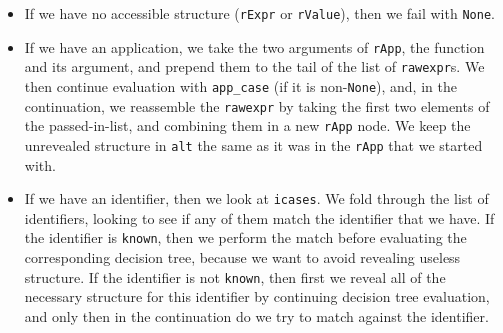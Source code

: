\begin{itemize}
\begin{itemize}
\begin{itemize}
\begin{itemize}
        \begin{itemize}
        \tightlist
        \item
          If we have no accessible structure (\texttt{rExpr} or
          \texttt{rValue}), then we fail with \texttt{None}.
        \item
          If we have an application, we take the two arguments of
          \texttt{rApp}, the function and its argument, and prepend them
          to the tail of the list of \texttt{rawexpr}s. We then continue
          evaluation with \texttt{app\_case} (if it is
          non-\texttt{None}), and, in the continuation, we reassemble
          the \texttt{rawexpr} by taking the first two elements of the
          passed-in-list, and combining them in a new \texttt{rApp}
          node. We keep the unrevealed structure in \texttt{alt} the
          same as it was in the \texttt{rApp} that we started with.
        \item
          If we have an identifier, then we look at \texttt{icases}. We
          fold through the list of identifiers, looking to see if any of
          them match the identifier that we have. If the identifier is
          \texttt{known}, then we perform the match before evaluating
          the corresponding decision tree, because we want to avoid
          revealing useless structure. If the identifier is not
          \texttt{known}, then first we reveal all of the necessary
          structure for this identifier by continuing decision tree
          evaluation, and only then in the continuation do we try to
          match against the identifier.


\end{itemize}
\end{itemize}
\end{itemize}
\end{itemize}
\end{itemize}
